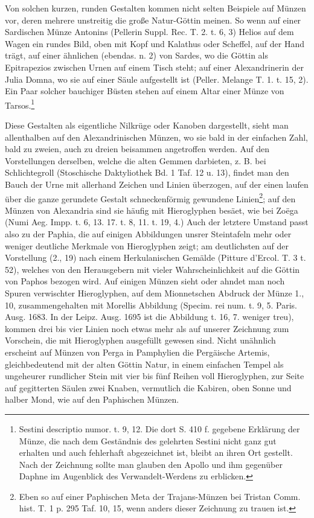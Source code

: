 \documentclass[a4paper, 11pt, oneside, polutonikogreek, german]{article}
\begin{document}
Von solchen kurzen, runden Gestalten kommen nicht selten Beispiele auf Münzen vor, deren mehrere unstreitig die große Natur-Göttin meinen. So wenn auf einer Sardischen Münze Antonins (Pellerin Suppl. Rec. T. 2. t. 6, 3) Helios auf dem Wagen ein rundes Bild, oben mit Kopf und Kalathus oder Scheffel, auf der Hand trägt, auf einer ähnlichen (ebendas. n. 2) von Sardes, wo die Göttin als Epitrapezios zwischen Urnen auf einem Tisch steht; auf einer Alexandrinerin der Julia Domna, wo sie auf einer Säule aufgestellt ist (Peller. Melange T. 1. t. 15, 2). Ein Paar solcher bauchiger Büsten stehen auf einem Altar einer Münze von Tarsos.\footnote{Sestini descriptio numor. t. 9, 12. Die dort S. 410 f. gegebene Erklärung der Münze, die nach dem Geständnis des gelehrten Sestini nicht ganz gut erhalten und auch fehlerhaft abgezeichnet ist, bleibt an ihren Ort gestellt. Nach der Zeichnung sollte man glauben den Apollo und ihm gegenüber Daphne im Augenblick des Verwandelt-Werdens zu erblicken.}

Diese Gestalten als eigentliche Nilkrüge oder Kanoben dargestellt, sieht man allenthalben auf den Alexandrinischen Münzen, wo sie bald in der einfachen Zahl, bald zu zweien, auch zu dreien beisammen angetroffen werden. Auf den Vorstellungen derselben, welche die alten Gemmen darbieten, z. B. bei Schlichtegroll (Stoschische Daktyliothek Bd. 1 Taf. 12 u. 13), findet man den Bauch der Urne mit allerhand Zeichen und Linien überzogen, auf der einen laufen über die ganze gerundete Gestalt schneckenförmig gewundene Linien\footnote{Eben so auf einer Paphischen Meta der Trajans-Münzen bei Tristan Comm. hist. T. 1 p. 295 Taf. 10, 15, wenn anders dieser Zeichnung zu trauen ist.}; auf den Münzen von Alexandria sind sie häufig mit Hieroglyphen besäet, wie bei Zoëga (Numi Aeg. Impp. t. 6, 13. 17. t. 8, 11. t. 19, 4.) Auch der letztere Umstand passt also zu der Paphia, die auf einigen Abbildungen unsrer Steintafeln mehr oder weniger deutliche Merkmale von Hieroglyphen zeigt; am deutlichsten auf der Vorstellung (2., 19) nach einem Herkulanischen Gemälde (Pitture d'Ercol. T. 3 t. 52), welches von den Herausgebern mit vieler Wahrscheinlichkeit auf die Göttin von Paphos bezogen wird. Auf einigen Münzen sieht oder ahndet man noch Spuren verwischter Hieroglyphen, auf dem Mionnetschen Abdruck der Münze 1., 10, zusammengehalten mit Morellis Abbildung (Specim. rei num. t. 9, 5. Paris. Ausg. 1683. In der Leipz. Ausg. 1695 ist die Abbildung t. 16, 7. weniger treu), kommen drei bis vier Linien noch etwas mehr als auf unserer Zeichnung zum Vorschein, die mit Hieroglyphen ausgefüllt gewesen sind. Nicht unähnlich erscheint auf Münzen von Perga in Pamphylien die Pergäische Artemis, gleichbedeutend mit der alten Göttin Natur, in einem einfachen Tempel als ungeheurer rundlicher Stein mit vier bis fünf Reihen voll Hieroglyphen, zur Seite auf gegitterten Säulen zwei Knaben, vermutlich die Kabiren, oben Sonne und halber Mond, wie auf den Paphischen Münzen.
\end{document}
